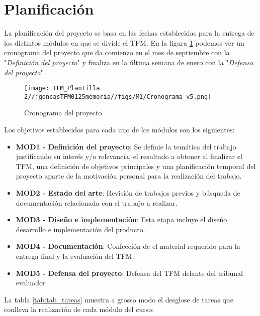 \documentclass[12pt,a4paper,twoside]{book}
\begin{document}
\section{Planificación}

La planificación del proyecto se basa en las fechas establecidas para la entrega de los distintos módulos en que se divide el TFM. En la figura \ref{fig:fig_cronograma} podemos ver un cronograma del proyecto que da comienzo en el mes de septiembre con la "\textit{Definición del proyecto}" y finaliza en la última semana de enero con la "\textit{Defensa del proyecto}".

\begin{figure}[H]
    \centering
    \texttt{[image: TFM\_Plantilla 2//jgoncasTFM0125memoria//figs/M1/Cronograma\_v5.png]}
    \caption{Cronograma del proyecto}
    \label{fig:fig_cronograma}
\end{figure}

Los objetivos establecidos para cada uno de los módulos son los siguientes:
\begin{itemize}
    \setlength\itemsep{0.1em}
    \item \textbf{MOD1 - Definición del proyecto}: 
    Se definie la temática del trabajo justificando su interés y/o relevancia, el resultado a obtener al finalizar el TFM, una definición de objetivos principales y una planificación temporal del proyecto aparte de la motivación personal para la realización del trabajo.
    \item \textbf{MOD2 - Estado del arte}: 
    Revisión de trabajos previos y búsqueda de documentación relacionada con el trabajo a realizar.
    \item \textbf{MOD3 - Diseño e implementación}: 
    Esta etapa incluye el diseño, desarrollo e implementación del producto.
    \item \textbf{MOD4 - Documentación}: 
    Confección de el material requerido para la entrega final y la evaluación del TFM.
    \item \textbf{MOD5 - Defensa del proyecto}: 
    Defensa del TFM delante del tribunal evaluador
\end{itemize}
La tabla \ref{tab:tab_tareas} muestra a grosso modo el desglose de tareas que conlleva la realización de cada módulo del curso:
\end{document}
